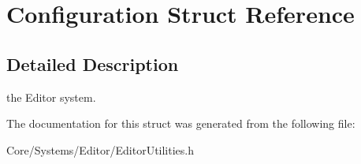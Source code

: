 \hypertarget{structConfiguration}{\section{Configuration Struct Reference}
\label{structConfiguration}
}


\subsection{Detailed Description}
the Editor system. 

The documentation for this struct was generated from the following file\-:\begin{DoxyCompactItemize}
\item 
Core/\-Systems/\-Editor/Editor\-Utilities.\-h\end{DoxyCompactItemize}
